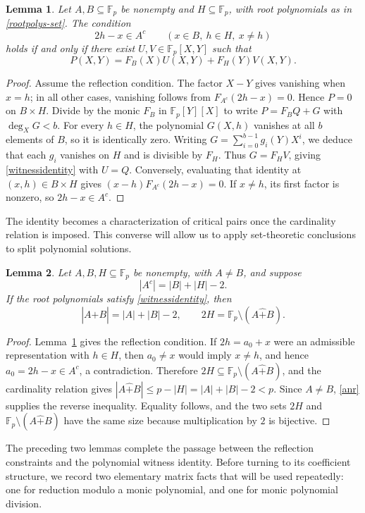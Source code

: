 \documentclass[10pt,a4paper]{amsart}
\newtheorem{lemma}{Lemma}[section]
\newcommand{\F}{\mathbb{F}_p}
\newcommand{\rs}{\mathbin{\widehat+}}
\begin{document}
\begin{lemma}\label{gridlemma}
Let $A,B\subseteq\F$ be nonempty and $H\subseteq\F$, with root
polynomials as in \eqref{rootpolys-set}.  The condition
\[
 2h-x\in A^c\qquad(x\in B,\ h\in H,\ x\ne h)
\]
holds if and only if there exist $U,V\in\F[X,Y]$ such that
\begin{equation}\label{witnessidentity}
 P(X,Y)=F_B(X)U(X,Y)+F_H(Y)V(X,Y).
\end{equation}
\end{lemma}
\begin{proof}
Assume the reflection condition.  The factor $X-Y$ gives vanishing when $x=h$; in all other cases,
vanishing follows from $F_{A^c}(2h-x)=0$.  Hence $P=0$ on
$B\times H$.  Divide by the monic $F_B$ in $\F[Y][X]$ to write
$P=F_BQ+G$ with $\deg_XG<b$.  For every $h\in H$, the polynomial
$G(X,h)$ vanishes at all $b$ elements of $B$, so it is identically zero.
Writing $G=\sum_{i=0}^{b-1}g_i(Y)X^i$, we deduce that each $g_i$
vanishes on $H$ and is divisible by $F_H$.  Thus $G=F_HV$, giving
\eqref{witnessidentity} with $U=Q$.
Conversely, evaluating that identity at $(x,h)\in B\times H$ gives
$(x-h)F_{A^c}(2h-x)=0$.  If $x\ne h$, its first factor is nonzero,
so $2h-x\in A^c$.
\end{proof}

The identity becomes a characterization of critical pairs once the
cardinality relation is imposed.  This converse will allow us to apply
set-theoretic conclusions to split polynomial solutions.

\begin{lemma}\label{reconstruction}
Let $A,B,H\subseteq\F$ be nonempty, with $A\ne B$, and suppose
\[
 |A^c|=|B|+|H|-2.
\]
If the root polynomials satisfy \eqref{witnessidentity}, then
\[
 |A\rs B|=|A|+|B|-2,\qquad 2H=\F\setminus(A\rs B).
\]
\end{lemma}
\begin{proof}
Lemma~\ref{gridlemma} gives the reflection condition.  If
$2h=a_0+x$ were an admissible representation with $h\in H$, then
$a_0\ne x$ would imply $x\ne h$, and hence
$a_0=2h-x\in A^c$, a contradiction.  Therefore
$2H\subseteq\F\setminus(A\rs B)$, and the cardinality relation gives
$|A\rs B|\le p-|H|=|A|+|B|-2<p$.  Since $A\ne B$, \eqref{anr} supplies the reverse inequality.
Equality follows, and the two sets $2H$ and $\F\setminus(A\rs B)$
have the same size because multiplication by $2$ is bijective.
\end{proof}

The preceding two lemmas complete the passage between the reflection
constraints and the polynomial witness identity.  Before turning to its
coefficient structure, we record two elementary matrix facts that will be
used repeatedly: one for reduction modulo a monic polynomial, and one for
monic polynomial division.
\end{document}
